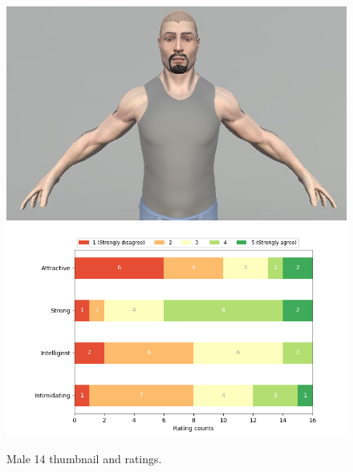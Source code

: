 \begin{figure}[H]
  \includegraphics[width=\linewidth]{Images/Males/14.JPG}
\endminipage\hfill
{}
  \includegraphics[width=\linewidth]{Survey/MRatings/avatar_m14.png}
\endminipage\hfill
\caption{Male 14 thumbnail and ratings.}
\end{figure}


